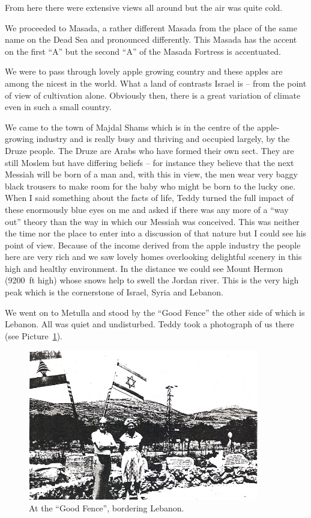 From here there were extensive views all around but the air was quite
cold.

We proceeded to Masada, a rather different Masada from the place of
the same name on the Dead Sea and pronounced differently. This Masada
has the accent on the first ``A'' but the second ``A'' of the Masada
Fortress is accentuated.

We were to pass through lovely apple growing country and these apples
are among the nicest in the world. What a land of contrasts Israel is
-- from the point of view of cultivation alone. Obviously then, there
is a great variation of climate even in such a small country.

We came to the town of Majdal Shams which is in the centre of the
apple-growing industry and is really busy and thriving and occupied
largely, by the Druze people. The Druze are Arabs who have formed
their own sect. They are still Moslem but have differing beliefs --
for instance they believe that the next Messiah will be born of a man
and, with this in view, the men wear very baggy black trousers to make
room for the baby who might be born to the lucky one. When I said
something about the facts of life, Teddy turned the full impact of
these enormously blue eyes on me and asked if there was any more of a
``way out'' theory than the way in which our Messiah was
conceived. This was neither the time nor the place to enter into a
discussion of that nature but I could see his point of view.  Because
of the income derived from the apple industry the people here are very
rich and we saw lovely homes overlooking delightful scenery in this
high and healthy environment.  In the distance we could see Mount
Hermon (9200~ft high) whose snows help to swell the Jordan river.
This is the very high peak which is the cornerstone of Israel, Syria
and Lebanon.

We went on to Metulla and stood by the ``Good Fence'' the other side
of which is Lebanon. All was quiet and undisturbed. Teddy took a
photograph of us there (see Picture~\ref{israel2}).

\begin{figure}
  \centering
  \includegraphics[width=0.9\textwidth]{photos/israel2}
  \caption{At the ``Good Fence'', bordering Lebanon.}
  \label{israel2}
\end{figure}

